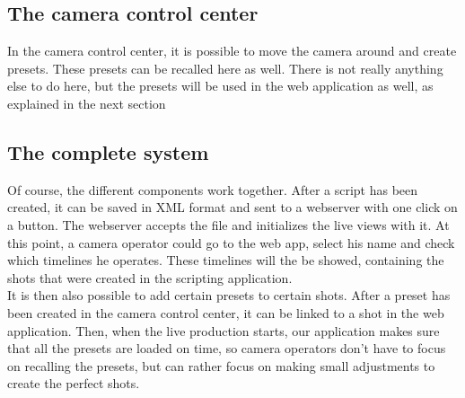 \subsection{The camera control center}
In the camera control center, it is possible to move the camera around and create presets. These presets can be recalled here as well. There is not really anything else to do here, but the presets will be used in the web application as well, as explained in the next section

\subsection{The complete system}
Of course, the different components work together. After a script has been created, it can be saved in XML format and sent to a webserver with one click on a button. The webserver accepts the file and initializes the live views with it. At this point, a camera operator could go to the web app, select his name and check which timelines he operates. These timelines will the be showed, containing the shots that were created in the scripting application.\\
It is then also possible to add certain presets to certain shots. After a preset has been created in the camera control center, it can be linked to a shot in the web application. Then, when the live production starts, our application makes sure that all the presets are loaded on time, so camera operators don't have to focus on recalling the presets, but can rather focus on making small adjustments to create the perfect shots.